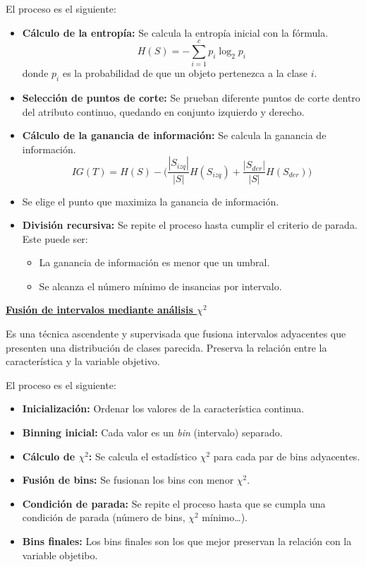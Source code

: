 \documentclass[12pt, letterpaper]{article}
\begin{document}
El proceso es el siguiente:
\begin{itemize}
    \item \textbf{Cálculo de la entropía:} Se calcula la entropía inicial con la fórmula.
    \[
        H(S) = -\sum_{i=1}^{c} p_i \log_2 p_i
    \]
    donde $p_i$ es la probabilidad de que un objeto pertenezca a la clase $i$.
    \item \textbf{Selección de puntos de corte:} Se prueban diferente puntos de corte dentro del atributo continuo, quedando en conjunto izquierdo y derecho.
    \item \textbf{Cálculo de la ganancia de información:} Se calcula la ganancia de información.
    \[
        IG(T) = H(S) - \bigg( \frac{|S_{izq}|}{|S|}H(S_{izq}) + \frac{|S_{der}|}{|S|}H(S_{der}) \bigg)
    \]

    \item Se elige el punto que maximiza la ganancia de información.
    \item \textbf{División recursiva:} Se repite el proceso hasta cumplir el criterio de parada. Este puede ser:
    \begin{itemize}
        \item La ganancia de información es menor que un umbral.
        \item Se alcanza el número mínimo de insancias por intervalo.
    \end{itemize}
\end{itemize}

\vspace{1 em}
\underline{\textbf{Fusión de intervalos mediante análisis $\chi^2$}}

Es una técnica ascendente y supervisada que fusiona intervalos adyacentes que presenten una distribución de clases parecida. Preserva la relación entre la característica y la variable objetivo.

El proceso es el siguiente:
\begin{itemize}
    \item \textbf{Inicialización:} Ordenar los valores de la característica continua.
    \item \textbf{Binning inicial:} Cada valor es un \textit{bin} (intervalo) separado.
    \item \textbf{Cálculo de $\chi^2$:} Se calcula el estadístico $\chi^2$ para cada par de bins adyacentes.
    \item \textbf{Fusión de bins:} Se fusionan los bins con menor $\chi^2$.
    \item \textbf{Condición de parada:} Se repite el proceso hasta que se cumpla una condición de parada (número de bins, $\chi^2$ mínimo\dots).
    \item \textbf{Bins finales:} Los bins finales son los que mejor preservan la relación con la variable objetibo.
\end{itemize}
\end{document}
